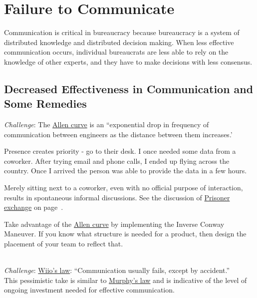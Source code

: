 \section{Failure to Communicate\label{sec:failure-to-comm}}

Communication is critical in bureaucracy because bureaucracy is a system of distributed knowledge and distributed decision making. When less effective communication occurs, individual bureaucrats are less able to rely on the knowledge of other experts, and they have to make decisions with less consensus. 

\subsection*{Decreased Effectiveness in Communication and Some Remedies}

\textit{Challenge}: The \href{https://en.wikipedia.org/wiki/Allen_curve}{Allen curve} is 
an ``exponential drop in frequency of communication between engineers as the distance between them increases.'

Presence creates priority - go to their desk. I once needed some data from a coworker. After trying email and phone calls, I ended up flying across the country. Once I arrived the person was able to provide the data in a few hours.

Merely sitting next to a coworker, even with no official purpose of interaction, results in spontaneous informal discussions. See the discussion of 
\hyperref[sec:prisoner-exchange]{Prisoner exchange} on 
page~\pageref{sec:prisoner-exchange}.

Take advantage of the \href{https://en.wikipedia.org/wiki/Allen_curve}{Allen curve} by implementing the Inverse Conway Maneuver. If you know what structure is needed for a product, then design the placement of your team to reflect that.

\ \\
\textit{Challenge}: \href{https://en.wikipedia.org/wiki/Wiio\%27s_laws}{Wiio's law}: 
``Communication usually fails, except by accident.''\\
This pessimistic take is similar to \href{https://en.wikipedia.org/wiki/Murphy\%27s_law}{Murphy's law} and is indicative of the level of ongoing investment needed for effective communication. 

